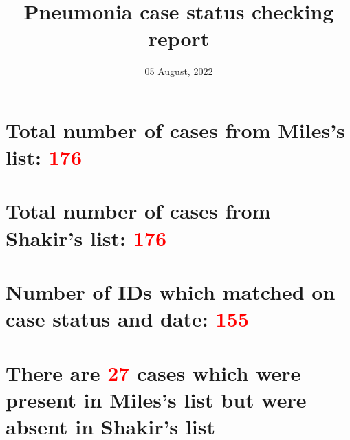 \documentclass[
]{article}
\title{\textbf{Pneumonia case status checking report}}
\author{}
\date{\vspace{-2.5em}05 August, 2022}
\begin{document}
\maketitle

\hypertarget{total-number-of-cases-from-miless-list}{%
\section{\texorpdfstring{Total number of cases from Miles's list:
\textcolor{red}{176}}{Total number of cases from Miles's list: }}\label{total-number-of-cases-from-miless-list}}

\hypertarget{total-number-of-cases-from-shakirs-list}{%
\section{\texorpdfstring{Total number of cases from Shakir's list:
\textcolor{red}{176}}{Total number of cases from Shakir's list: }}\label{total-number-of-cases-from-shakirs-list}}

\hypertarget{number-of-ids-which-matched-on-case-status-and-date}{%
\section{\texorpdfstring{Number of IDs which matched on case status and
date:
\textcolor{red}{155}}{Number of IDs which matched on case status and date: }}\label{number-of-ids-which-matched-on-case-status-and-date}}

\hypertarget{there-are-cases-which-were-present-in-miless-list-but-were-absent-in-shakirs-list}{%
\section{\texorpdfstring{There are \textcolor{red}{27} cases which were
present in Miles's list but were absent in Shakir's
list}{There are  cases which were present in Miles's list but were absent in Shakir's list}}\label{there-are-cases-which-were-present-in-miless-list-but-were-absent-in-shakirs-list}}
\end{document}
